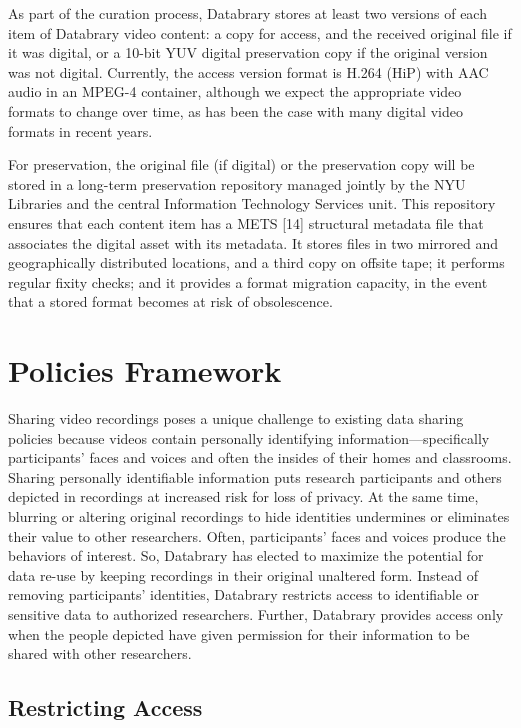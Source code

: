 \documentclass{sig-alternate}
\begin{document}
As part of the curation process, Databrary stores at least two versions
of each item of Databrary video content: a copy for access, and the
received original file if it was digital, or a 10-bit YUV digital
preservation copy if the original version was not digital. Currently,
the access version format is H.264 (HiP) with AAC audio in an MPEG-4
container, although we expect the appropriate video formats to change
over time, as has been the case with many digital video formats in
recent years.

For preservation, the original file (if digital) or the preservation
copy will be stored in a long-term preservation repository managed
jointly by the NYU Libraries and the central Information Technology
Services unit. This repository ensures that each content item has a METS
[14] structural metadata file that associates the digital asset with its
metadata. It stores files in two mirrored and geographically distributed
locations, and a third copy on offsite tape; it performs regular fixity
checks; and it provides a format migration capacity, in the event that a
stored format becomes at risk of obsolescence.

\section{Policies Framework}

Sharing video recordings poses a unique challenge to existing data
sharing policies because videos contain personally identifying
information—specifically participants’ faces and voices and often the
insides of their homes and classrooms. Sharing personally identifiable
information puts research participants and others depicted in recordings
at increased risk for loss of privacy. At the same time, blurring or
altering original recordings to hide identities undermines or eliminates
their value to other researchers. Often, participants’ faces and voices
produce the behaviors of interest. So, Databrary has elected to maximize
the potential for data re-use by keeping recordings in their original
unaltered form. Instead of removing participants’ identities, Databrary
restricts access to identifiable or sensitive data to authorized
researchers. Further, Databrary provides access only when the people
depicted have given permission for their information to be shared with
other researchers.

\subsection{Restricting Access}
\end{document}
